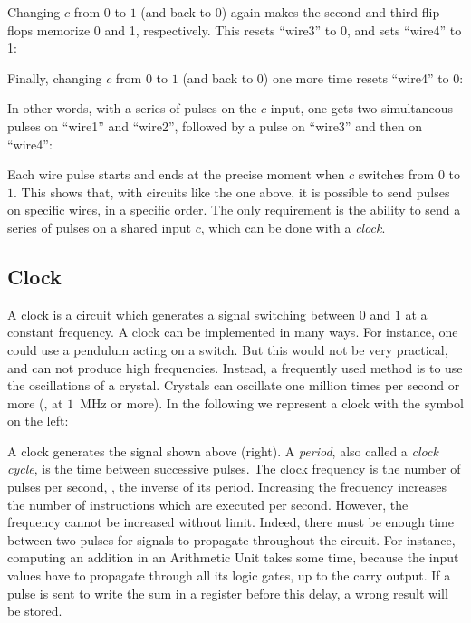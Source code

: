 Changing $c$ from $0$ to $1$ (and back to $0$) again makes the second and third
flip-flops memorize 0 and 1, respectively. This resets ``wire3'' to 0, and sets
``wire4'' to 1:

\begin{center}
  
\end{center}

Finally, changing $c$ from $0$ to $1$ (and back to $0$) one more time resets
``wire4'' to 0:

\begin{center}
  
\end{center}

In other words, with a series of pulses on the $c$ input, one gets two
simultaneous pulses on ``wire1'' and ``wire2'', followed by a pulse on
``wire3'' and then on ``wire4'':

\begin{center}
  
\end{center}

Each wire pulse starts and ends at the precise moment when $c$ switches from
$0$ to $1$. This shows that, with circuits like the one above, it is possible
to send pulses on specific wires, in a specific order. The only requirement is
the ability to send a series of pulses on a shared input $c$, which can be done
with a {\em clock}.

\subsection{Clock}

A clock is a circuit which generates a signal switching between $0$ and $1$ at
a constant frequency. A clock can be implemented in many ways. For instance,
one could use a pendulum acting on a switch. But this would not be very
practical, and can not produce high frequencies. Instead, a frequently used
method is to use the oscillations of a crystal. Crystals can oscillate one
million times per second or more (\ie, at $1$~MHz or more). In the following we
represent a clock with the symbol on the left:

\begin{center}
  
  
\end{center}

A clock generates the signal shown above (right). A {\em period}, also called a
{\em clock cycle}, is the time between successive pulses. The clock frequency
is the number of pulses per second, \ie, the inverse of its period. Increasing
the frequency increases the number of instructions which are executed per
second. However, the frequency cannot be increased without limit. Indeed, there
must be enough time between two pulses for signals to propagate throughout the
circuit. For instance, computing an addition in an Arithmetic Unit takes some
time, because the input values have to propagate through all its logic gates,
up to the carry output. If a pulse is sent to write the sum in a register
before this delay, a wrong result will be stored.

